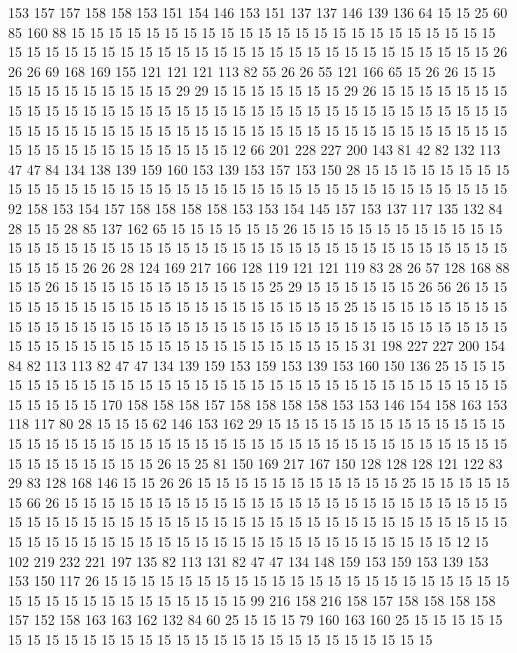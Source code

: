 153 157 157 158 158 153 151 154 146 153 151 137 137 146 139 136 64 15 15 25
60 85 160 88 15 15 15 15 15 15 15 15 15 15 15 15 15 15 15 15
15 15 15 15 15 15 15 15 15 15 15 15 15 15 15 15 15 15 15 15
15 15 15 15 15 15 15 15 15 15 15 15 15 26 26 26 69 168 169 155
121 121 121 113 82 55 26 26 55 121 166 65 15 26 26 15 15 15 15 15
15 15 15 15 15 15 29 29 15 15 15 15 15 15 15 29 26 15 15 15
15 15 15 15 15 15 15 15 15 15 15 15 15 15 15 15 15 15 15 15
15 15 15 15 15 15 15 15 15 15 15 15 15 15 15 15 15 15 15 15
15 15 15 15 15 15 15 15 15 15 15 15 15 15 15 15 15 15 15 15
15 15 15 15 15 15 15 15 15 15 12 66 201 228 227 200 143 81 42 82
132 113 47 47 84 134 138 139 159 160 153 139 153 157 153 150 28 15 15 15
15 15 15 15 15 15 15 15 15 15 15 15 15 15 15 15 15 15 15 15
15 15 15 15 15 15 15 15 15 15 15 15 92 158 153 154 157 158 158 158
158 153 153 154 145 157 153 137 117 135 132 84 28 15 15 28 85 137 162 65
15 15 15 15 15 15 26 15 15 15 15 15 15 15 15 15 15 15 15 15
15 15 15 15 15 15 15 15 15 15 15 15 15 15 15 15 15 15 15 15
15 15 15 15 15 15 15 15 15 26 26 28 124 169 217 166 128 119 121 121
119 83 28 26 57 128 168 88 15 15 26 15 15 15 15 15 15 15 15 15
15 15 25 29 15 15 15 15 15 15 26 56 26 15 15 15 15 15 15 15
15 15 15 15 15 15 15 15 15 15 15 15 15 25 15 15 15 15 15 15
15 15 15 15 15 15 15 15 15 15 15 15 15 15 15 15 15 15 15 15
15 15 15 15 15 15 15 15 15 15 15 15 15 15 15 15 15 15 15 15
15 15 15 15 15 15 15 15 31 198 227 227 200 154 84 82 113 113 82 47
47 134 139 159 153 159 153 139 153 160 150 136 25 15 15 15 15 15 15 15
15 15 15 15 15 15 15 15 15 15 15 15 15 15 15 15 15 15 15 15
15 15 15 15 15 15 15 15 170 158 158 158 157 158 158 158 158 153 153 146
154 158 163 153 118 117 80 28 15 15 15 62 146 153 162 29 15 15 15 15
15 15 15 15 15 15 15 15 15 15 15 15 15 15 15 15 15 15 15 15
15 15 15 15 15 15 15 15 15 15 15 15 15 15 15 15 15 15 15 15
15 15 15 15 26 15 25 81 150 169 217 167 150 128 128 128 121 122 83 29
83 128 168 146 15 15 26 26 15 15 15 15 15 15 15 15 15 15 15 25
15 15 15 15 15 15 66 26 15 15 15 15 15 15 15 15 15 15 15 15
15 15 15 15 15 15 15 15 15 15 15 15 15 15 15 15 15 15 15 15
15 15 15 15 15 15 15 15 15 15 15 15 15 15 15 15 15 15 15 15
15 15 15 15 15 15 15 15 15 15 15 15 15 15 15 15 15 15 15 15
15 15 15 12 15 102 219 232 221 197 135 82 113 131 82 47 47 134 148 159
153 159 153 139 153 153 150 117 26 15 15 15 15 15 15 15 15 15 15 15
15 15 15 15 15 15 15 15 15 15 15 15 15 15 15 15 15 15 15 15
15 15 15 15 99 216 158 216 158 157 158 158 158 158 157 152 158 163 163 162
132 84 60 25 15 15 15 79 160 163 160 25 15 15 15 15 15 15 15 15
15 15 15 15 15 15 15 15 15 15 15 15 15 15 15 15 15 15 15 15
